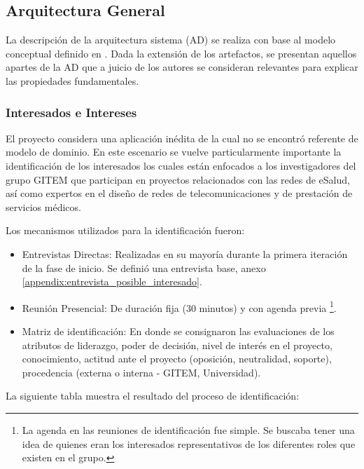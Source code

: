 \subsection{Arquitectura General}

La descripción de la arquitectura sistema (AD) se realiza con base al modelo conceptual definido en \cite{ISO42010}. Dada la extensión de los artefactos, se presentan aquellos apartes de la AD que a juicio de los autores se consideran relevantes para explicar las propiedades fundamentales.

\subsubsection{Interesados e Intereses}

El proyecto considera una aplicación inédita de la cual no se encontró referente de modelo de dominio. En este escenario se vuelve particularmente importante la identificación de los interesados los cuales están enfocados a los investigadores del grupo GITEM que participan en proyectos relacionados con las redes de eSalud, así como expertos en el diseño de redes de telecomunicaciones y de prestación de servicios médicos.

Los mecanismos utilizados para la identificación fueron:

\begin{itemize}
 \item Entrevistas Directas: Realizadas en su mayoría durante la primera iteración de la fase de inicio. Se definió una entrevista base, anexo \ref{appendix:entrevista_posible_interesado}.
 \item Reunión Presencial: De duración fija (30 minutos) y con agenda previa \footnote{La agenda en las reuniones de identificación fue simple. Se buscaba tener una idea de quienes eran los interesados representativos de los diferentes roles que existen en el grupo.}.
 \item Matriz de identificación: En donde se consignaron las evaluaciones de los atributos de liderazgo, poder de decisión, nivel de interés en el proyecto, conocimiento, actitud ante el proyecto (oposición, neutralidad, soporte), procedencia (externa o interna - GITEM, Universidad). 
\end{itemize}

La siguiente tabla muestra el resultado del proceso de identificación:


